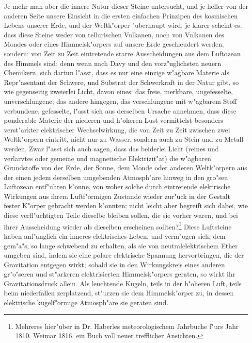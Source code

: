 \documentclass[a4paper, 11pt, oneside, polutonikogreek, german]{article}
\begin{document}
Je mehr man aber die innere Natur dieser Steine untersucht, und je heller von der anderen Seite unsere Einsicht in die ersten einfachen Prinzipen des kosmischen Lebens unserer Erde, und der Weltk"orper "uberhaupt wird, je klarer scheint es: dass diese Steine weder von tellurischen Vulkanen, noch von Vulkanen des Mondes oder eines Himmelsk"orpers auf unsere Erde geschleudert werden, sondern: von Zeit zu Zeit eintretende starre Ausscheidungen aus dem Luftozean des Himmels sind; denn wenn nach Davy und den vorz"uglichsten neuern Chemikern, sich dartun l"asst, dass es nur eine einzige w"agbare Materie als Repr"asentant der Schwere, und Substrat der Schwerkraft in der Natur gibt, so wie gegenseitig zweierlei Licht, davon eines: das freie, merkbare, ungefesselte, unverschlungene; das andere hingegen, das verschlungene mit w"agbarem Stoff verbundene, gefesselte, l"asst sich aus derselben Ursache annehmen, dass diese ponderable Materie der niederen und h"oheren Lust vermittelst besonders verst"arkter elektrischer Wechselwirkung, die von Zeit zu Zeit zwischen zwei Weltk"orpern eintritt, nicht nur zu Wasser, sondern auch zu Stein und zu Metall werden. Zwar l"asst sich auch sagen, dass das beiderlei Licht (reines und verlarvtes oder gemeine und magnetische Elektrizit"at) die w"agbaren Grundstoffe von der Erde, der Sonne, dem Monde oder anderen Weltk"orpern aus der einen jedem derselben umgebenden Atmosph"are hinweg in den gro"sen Luftozean entf"uhren k"onne, von woher solche durch eintretende elektrische Wirkungen aus ihrem Luftf"ormigen Zustande wieder zur"uck in der Gestalt fester K"orper gebracht werden k"onnten; nicht leicht aber begreift sich dabei, wie diese verfl"uchtigten Teile dieselbe bleiben sollen, die sie vorher waren, und bei ihrer Ausscheidung wieder als dieselben erscheinen sollten?\footnote{Mehreres hier"uber in Dr. Haberles meteorologischem Jahrbuche f"urs Jahr 1810. Weimar 1816. ein Buch voll neuer trefflicher Ansichten.} Diese Luftsteine haben anf"anglich ein inneres elektrisches Leben, und verm"ogen sich, dem gem"a"s, so lange schwebend zu erhalten, als sie von neutralelektrischem Ether umgeben sind, indem sie eine polare elektrische Spannung hervorbringen, die der Gravitation entgegen wirkt; sobald sie in den Wirkungskreis eines anderen gr"o"seren und st"arkeren elektrisierten Himmelsk"orpers geraten, so wirkt ihr Gravitationsdruck allein. Als leuchtende Kugeln, teils in der h"oheren Luft, teils beim niederfallen zerplatzend, st"urzen sie dem Himmelsk"orper zu, in dessen elektrische kugelf"ormige Atmosph"are sie geraten sind.
\end{document}
